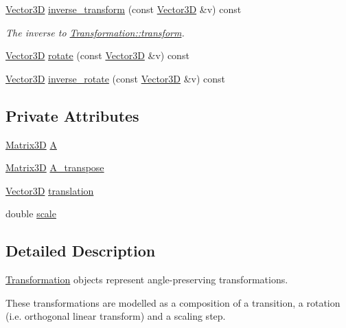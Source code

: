 \begin{DoxyCompactItemize}
\item 
\hyperlink{classVector3D}{Vector3D} \hyperlink{classlinalg_1_1Transformation_a5c37fe3a882f9d29ea7382d1fe73843d}{inverse\+\_\+transform} (const \hyperlink{classVector3D}{Vector3D} \&v) const 
\begin{DoxyCompactList}\small\item\em The inverse to \hyperlink{classlinalg_1_1Transformation_a5b31c95da6547d580236566266c840a6}{Transformation\+::transform}. \end{DoxyCompactList}\item 
\hyperlink{classVector3D}{Vector3D} \hyperlink{classlinalg_1_1Transformation_a186fce9fbf82aa998cf1f92d2be5b10c}{rotate} (const \hyperlink{classVector3D}{Vector3D} \&v) const 
\item 
\hyperlink{classVector3D}{Vector3D} \hyperlink{classlinalg_1_1Transformation_a01cfc4e7905418f1c1091cebebbb8580}{inverse\+\_\+rotate} (const \hyperlink{classVector3D}{Vector3D} \&v) const 
\end{DoxyCompactItemize}
\subsection*{Private Attributes}
\begin{DoxyCompactItemize}
\item 
\hyperlink{classlinalg_1_1Matrix3D}{Matrix3D} \hyperlink{classlinalg_1_1Transformation_a24a75d79007bc9b5c5f32c042fb4332b}{A}
\item 
\hyperlink{classlinalg_1_1Matrix3D}{Matrix3D} \hyperlink{classlinalg_1_1Transformation_ac720d71bf88660e2ae3f3d776c7cfd01}{A\+\_\+transpose}
\item 
\hyperlink{classVector3D}{Vector3D} \hyperlink{classlinalg_1_1Transformation_a462cf5d72735591b01bef5186bb1fe98}{translation}
\item 
double \hyperlink{classlinalg_1_1Transformation_ac627b1362463a8c98fe3b5e633beb049}{scale}
\end{DoxyCompactItemize}


\subsection{Detailed Description}
\hyperlink{classlinalg_1_1Transformation}{Transformation} objects represent angle-\/preserving transformations. 

These transformations are modelled as a composition of a transition, a rotation (i.\+e. orthogonal linear transform) and a scaling step. 

